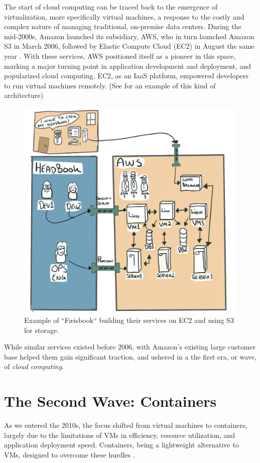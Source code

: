\documentclass[
  table]{report}
\begin{document}
The start of cloud computing can be traced back to the emergence of
virtualization, more specifically virtual machines, a response to the
costly and complex nature of managing traditional, on-premise data
centers. During the mid-2000s, Amazon launched its subsidiary, \ac{AWS},
who in turn launched Amazon S3 in March 2006, followed by Elastic
Compute Cloud (EC2) in August the same year
\citep{barrAmazonEC2Beta2006}. With these services, \ac{AWS} positioned
itself as a pioneer in this space, marking a major turning point in
application development and deployment, and popularized cloud computing.
EC2, as an \ac{IaaS} platform, empowered developers to run virtual
machines remotely. (See  for an example of this kind
of architecture)

\begin{figure}[H]
\centering
  \includegraphics[width=0.7\columnwidth]{assets/aws-wave.jpg}
  \caption{Example of ``Fæisbook`` building their services on EC2 and using S3
for storage.}
  \label{fig:feisbook}
\end{figure}

While similar services existed before 2006, with Amazon's existing large
customer base helped them gain significant traction, and ushered in a
the first era, or wave, of \emph{cloud computing}.

\section{The Second Wave: Containers}
\label{sect:second-wave}

As we entered the 2010s, the focus shifted from virtual machines to
containers, largely due to the limitations of VMs in efficiency,
resource utilization, and application deployment speed. Containers,
being a lightweight alternative to VMs, designed to overcome these
hurdles \citep{bao2016}.
\end{document}
